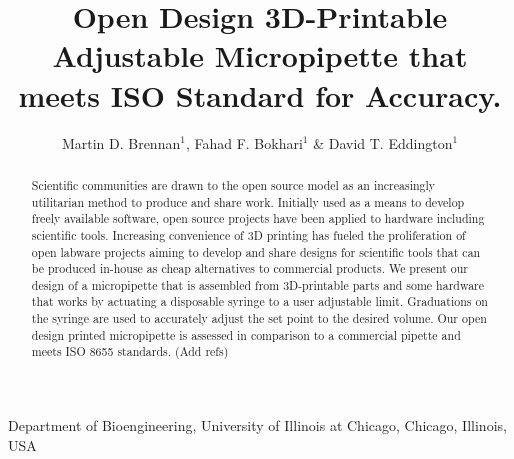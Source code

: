 \documentclass{nature}
\title{Open Design 3D-Printable Adjustable Micropipette that meets ISO Standard for Accuracy.}
\author{Martin D. Brennan$^1$, Fahad F. Bokhari$^1$ \& David T. Eddington$^1$}
\begin{document}
\maketitle

\begin{affiliations}
 \item Department of Bioengineering, University of Illinois at Chicago, Chicago, Illinois, USA
\end{affiliations}

\begin{abstract}
Scientific communities are drawn to the open source model as an increasingly utilitarian method to produce and share work.
Initially used as a means to develop freely available software, open source projects have been applied to hardware including scientific tools.
Increasing convenience of 3D printing has fueled the proliferation of open labware projects aiming to develop and share designs for scientific tools that can be produced in-house as cheap alternatives to commercial products.
We present our design of a micropipette that is assembled from 3D-printable parts and some hardware that works by actuating a disposable syringe to a user adjustable limit.
Graduations on the syringe are used to accurately adjust the set point to the desired volume.  
Our open design printed micropipette is assessed in comparison to a commercial pipette and meets ISO 8655 standards. (Add refs)
\end{abstract}
\end{document}
